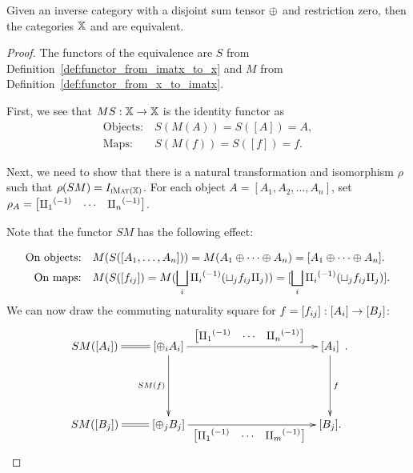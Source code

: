 \begin{proposition}\label{pro:x_and_imatx_are_equivalent}
  Given an inverse category \X with a disjoint sum tensor $\oplus$ and restriction zero, then the
  categories $\mathbb{X}$ and \imatx are equivalent.
\end{proposition}
\begin{proof}
  The functors of the equivalence are $S$ from Definition~\ref{def:functor_from_imatx_to_x} and
  $M$ from Definition~\ref{def:functor_from_x_to_imatx}.

  First, we see that $M S:\mathbb{X} \to \mathbb{X}$ is the identity functor as
  \begin{align*}
    \text{Objects:}\ &S(M(A)) = S([A]) = A,\\
    \text{Maps:}\ &S(M(f)) = S([f]) = f.
  \end{align*}

  Next, we need to show that there is a natural transformation and isomorphism $\rho$ such that
  $\rho(S M) = I_{\textsc{iMat}({\mathbb{X}})}$. For each object $A = [A_1,A_2,\ldots,A_n]$, set
  $\rho_A = \begin{bmatrix}{\amalg_{1}}^{(-1)}& \cdots &{\amalg_{n}}^{(-1)}\end{bmatrix}$.

  Note that the functor $S M$ has the following effect:

  \begin{align*}
    \text{On objects:}\quad &M(S([A_1,\ldots, A_n])) = M(A_1\oplus\cdots\oplus A_n) =
      [A_1\oplus\cdots\oplus A_n].\\
    \text{On maps:}\quad &M(S([f_{ij}]) = M(\bigsqcup_i {\amalg_{i}}^{(-1)} (\sqcup_j f_{ij} \amalg_{j}))
      = [\bigsqcup_i {\amalg_{i}}^{(-1)} (\sqcup_j f_{ij} \amalg_{j})].
  \end{align*}
  We can now draw the commuting naturality square for $f=[f_{ij}]:[A_i]\to [B_j]$:
  \[
    \xymatrix{
      SM([A_i]) \ar@{=}[r] & [\+_i A_i]
          \ar[rrrr]^{\begin{bmatrix}\icpa& \cdots &\icp{n}\end{bmatrix}}
          \ar[dd]_{SM(f)}
          & &&& [A_i] \ar[dd]^{f}\\
        &&&&&  \\
      SM([B_j]) \ar@{=}[r] & [\+_j B_j]
          \ar[rrrr]_{\begin{bmatrix}\icpa& \cdots &\icp{m}\end{bmatrix}}
          & &&& [B_j]. \\
    }.
  \]


\end{proof}
